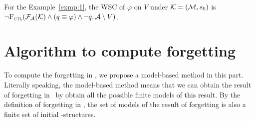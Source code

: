 \documentclass{article}
\begin{document}
%
%

\begin{example}
For the Example~\ref{exmp:1}, the WSC of $\varphi$ on $V$ under ${\cal K} =({\cal M}, s_0)$ is $\neg {\textsc{F}_{\textsc{ctl}}}({\cal F}_{{\cal A}}({\cal K}) \wedge (q \equiv \varphi) \wedge \neg q, {\cal A} \setminus V)$.
\end{example}


\section{Algorithm to compute forgetting}
To compute the forgetting in \CTL, we propose a model-based method in this part.
Literally speaking, the model-based method means that we can obtain the result of forgetting in \CTL\ by obtain all the possible finite models of this result.
By the definition of forgetting in \CTL, the set of models of the result of forgetting is also a finite set of initial \MPK-structures.
%
%
\end{document}

